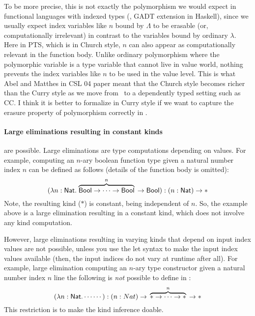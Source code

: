 To be more precise, this is not exactly the polymorphism we would expect
in functional languages with indexed types (\eg, GADT extension in Haskell),
since we usually expect index variables like $n$ bound by $\Lambda$ to be
erasable (or, computationally irrelevant) in contrast to the variables bound
by ordinary $\lambda$. Here in PTS, which is in Church style, $n$ can also
appear as computationally relevant in the function body. Unlike ordinary
polymorphism where the polymorphic variable is a type variable that cannot
live in value world, nothing prevents the index variables like $n$ to be used
in the value level. This is what Abel and Matthes in CSL 04 paper meant that
the Church style becomes richer than the Curry style as we move from \Fw\ to
a dependently typed setting such as CC. I think it is better to formalize
in Curry style if we want to capture the erasure property of polymorphism
correctly in \Fi.

\paragraph{Large eliminations resulting in constant kinds} are possible.
Large eliminations are type computations depending on values.  For example,
computing an $n$-ary boolean function type given a natural number index $n$
can be defined as follows (details of the function body is omitted):
\[
(\lambda n:\mathsf{Nat}. \stackrel{n}{\overbrace{\mathsf{Bool}-> \cdots-> \mathsf{Bool}}}\;\, -> \mathsf{Bool})
  : (n:\mathsf{Nat}) -> *
\]
Note, the resulting kind ($*$) is constant, being independent of $n$.
So, the example above is a large elimination resulting in a constant kind,
which does not involve any kind computation.

However, large eliminations resulting in varying kinds that depend on
input index values are not possible, unless you use the let syntax to make
the input index values available (then, the input indices do not vary
at runtime after all). For example, large elimination computing an $n$-ary
type constructor given a natural number index $n$ line the following
is \emph{not} possible to define in \Fi:
\[
(\lambda n:\mathsf{Nat}. \cdots \cdots)
  : (n:Nat) -> \,\;\stackrel{n}{\overbrace{* -> \cdots -> *}}\;\, -> *
\]
This restriction is to make the kind inference doable.

